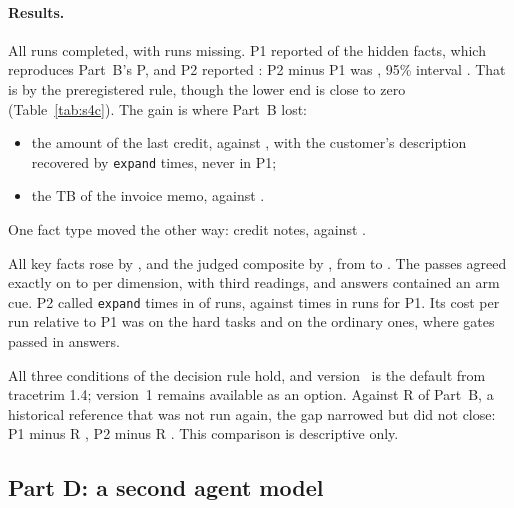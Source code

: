 \paragraph{Results.} All \SfourCRuns{} runs completed, with \SfourCMissing{} runs missing. P1 reported
\SfourCHiddenPone{} of the hidden facts, which reproduces Part~B's P, and P2 reported \SfourCHiddenPtwo{}: P2
minus P1 was \textbf{\SfourCPoint{}}, 95\% interval \textbf{\SfourCCI{}}. That is \emph{\SfourCVerdict} by the
preregistered rule, though the lower end is close to zero (Table~\ref{tab:s4c}). The gain is where Part~B lost:
\begin{itemize}
\item the amount of the last credit, \SfourCOriginPone{} against \SfourCOriginPtwo{}, with the customer's
description recovered by \texttt{expand} \SfourCOriginExpandPtwo{} times, never in P1;
\item the TB of the invoice memo, \SfourCMemoPone{} against \SfourCMemoPtwo{}.
\end{itemize}
One fact type moved the other way: credit notes, \SfourCCreditNotePone{} against \SfourCCreditNotePtwo{}.

All key facts rose by \SfourCFactsPoint{} \SfourCFactsCI{}, and the judged composite by \SfourCCompositePoint{}
\SfourCCompositeCI{}, from \SfourCCompositePone{} to \SfourCCompositePtwo{}. The passes agreed exactly on
\SfourCExactMin{} to \SfourCExactMax{} per dimension, with \SfourCAdjudicated{} third readings, and
\SfourCCues{} answers contained an arm cue. P2 called \texttt{expand} \SfourCExpandPtwo{} times in
\SfourCExpandRunsPtwo{} of \SfourCRunsPerArm{} runs, against \SfourCExpandPone{} times in \SfourCExpandRunsPone{}
runs for P1. Its cost per run relative to P1 was \SfourCHardCost{} on the hard tasks and \SfourCOrdinaryCost{} on
the ordinary ones, where gates passed in \SfourCOrdinaryGates{} answers.

All three conditions of the decision rule hold, and version~\SfourCDefault{} is the default from tracetrim 1.4;
version~1 remains available as an option. Against R of Part~B, a historical reference that was not run again, the gap narrowed but
did not close: P1 minus R \SfourCPoneMinusR{} \SfourCPoneMinusRCI{}, P2 minus R \SfourCPtwoMinusR{}
\SfourCPtwoMinusRCI{}. This comparison is descriptive only.

\subsection{Part D: a second agent model}
\label{sec:s4d}

